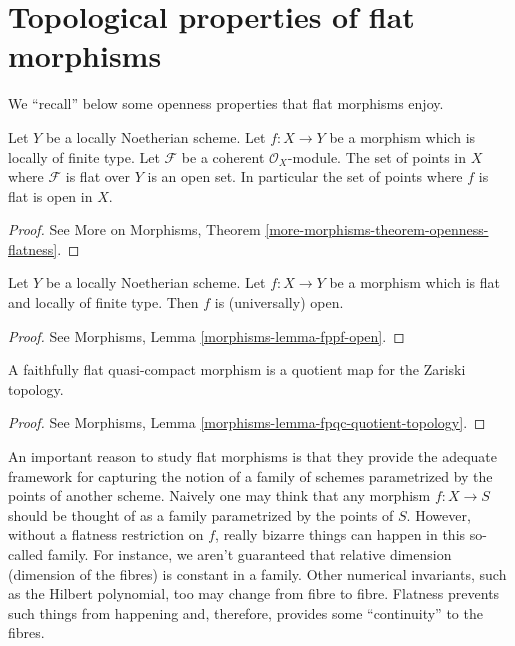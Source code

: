 \section{Topological properties of flat morphisms}
\label{section-topological-flat}

\noindent
We ``recall'' below some openness properties that flat morphisms enjoy.

\begin{theorem}
\label{theorem-flat-open}
Let $Y$ be a locally Noetherian scheme.
Let $f : X \to Y$ be a morphism which is locally of finite type.
Let $\mathcal{F}$ be a coherent $\mathcal{O}_X$-module.
The set of points in $X$ where $\mathcal{F}$ is flat over $Y$ is an open set.
In particular the set of points where $f$ is flat is open in $X$.
\end{theorem}

\begin{proof}
See More on Morphisms, Theorem \ref{more-morphisms-theorem-openness-flatness}.
\end{proof}

\begin{theorem}
\label{theorem-flat-map-open}
Let $Y$ be a locally Noetherian scheme.
Let $f : X \to Y$ be a morphism which is flat and locally of finite type.
Then $f$ is (universally) open.
\end{theorem}

\begin{proof}
See Morphisms, Lemma \ref{morphisms-lemma-fppf-open}.
\end{proof}

\begin{theorem}
\label{theorem-flat-is-quotient}
A faithfully flat quasi-compact morphism is a quotient map for
the Zariski topology.
\end{theorem}

\begin{proof}
See Morphisms, Lemma \ref{morphisms-lemma-fpqc-quotient-topology}.
\end{proof}

\noindent
An important reason to study flat morphisms is that they provide the adequate
framework for capturing the notion of a family of schemes parametrized by the
points of another scheme. Naively one may think that any morphism $f : X \to S$
should be thought of as a family parametrized by the points of $S$. However,
without a flatness restriction on $f$, really bizarre things can happen in
this so-called family. For instance, we aren't guaranteed that relative
dimension (dimension of the fibres) is constant in a family. Other numerical
invariants, such as the Hilbert polynomial, too may change from fibre to
fibre. Flatness prevents such things from happening and, therefore, provides
some ``continuity'' to the fibres.


